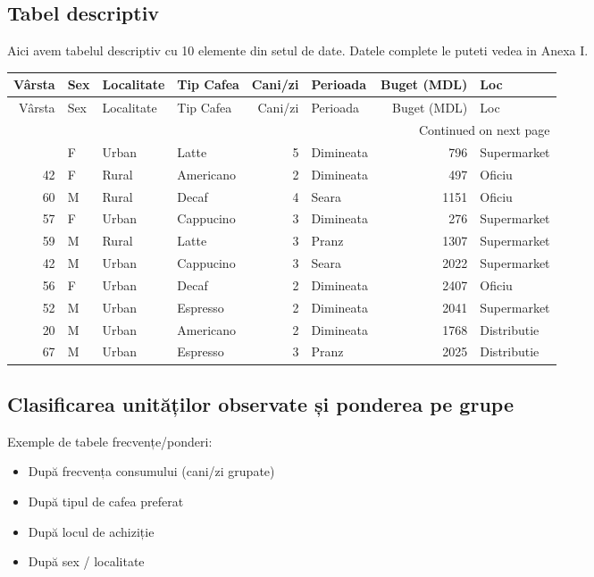 \documentclass[12pt,a4paper]{report}
\begin{document}
\subsection{Tabel descriptiv}
Aici avem tabelul descriptiv cu 10 elemente din setul de date. Datele complete le puteti vedea in Anexa I.

\begin{table}[H]
\centering
\caption{Primele 10 observații din setul de date}
\label{tab:primele5}
\begin{longtable}{rlllrlrl}
\toprule
Vârsta & Sex & Localitate & Tip Cafea & Cani/zi & Perioada & Buget (MDL) & Loc \\
\midrule
\endfirsthead
\toprule
Vârsta & Sex & Localitate & Tip Cafea & Cani/zi & Perioada & Buget (MDL) & Loc \\
\midrule
\endhead
\midrule
\multicolumn{8}{r}{Continued on next page} \\
\midrule
\endfoot
\bottomrule
\endlastfoot
18 & F & Urban & Latte & 5 & Dimineata & 796 & Supermarket \\
42 & F & Rural & Americano & 2 & Dimineata & 497 & Oficiu \\
60 & M & Rural & Decaf & 4 & Seara & 1151 & Oficiu \\
57 & F & Urban & Cappucino & 3 & Dimineata & 276 & Supermarket \\
59 & M & Rural & Latte & 3 & Pranz & 1307 & Supermarket \\
42 & M & Urban & Cappucino & 3 & Seara & 2022 & Supermarket \\
56 & F & Urban & Decaf & 2 & Dimineata & 2407 & Oficiu \\
52 & M & Urban & Espresso & 2 & Dimineata & 2041 & Supermarket \\
20 & M & Urban & Americano & 2 & Dimineata & 1768 & Distributie \\
67 & M & Urban & Espresso & 3 & Pranz & 2025 & Distributie \\
\end{longtable}

\end{table}

\subsection{Clasificarea unităților observate și ponderea pe grupe}
Exemple de tabele frecvențe/ponderi:
\begin{itemize}[leftmargin=1.2cm]
  \item După frecvența consumului (cani/zi grupate)
  \item După tipul de cafea preferat
  \item După locul de achiziție
  \item După sex / localitate
\end{itemize}
\end{document}
